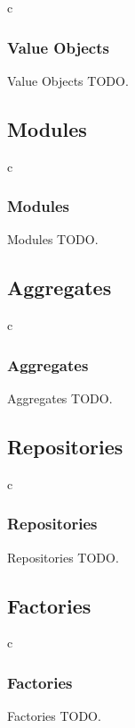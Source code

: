 \documentclass[a4paper,slidestop,xcolor=pst,dvips,blue]{beamer}
\begin{document}
\begin{frame}{c}
    \frametitle{Value Objects}
    \begin{block}{Value Objects}
    TODO.
    \end{block}
\end{frame}

\subsection{Modules}

\begin{frame}{c}
    \frametitle{Modules}
    \begin{block}{Modules}
    TODO.
    \end{block}
\end{frame}

\subsection{Aggregates}

\begin{frame}{c}
    \frametitle{Aggregates}
    \begin{block}{Aggregates}
    TODO.
    \end{block}
\end{frame}

\subsection{Repositories}

\begin{frame}{c}
    \frametitle{Repositories}
    \begin{block}{Repositories}
    TODO.
    \end{block}
\end{frame}

\subsection{Factories}

\begin{frame}{c}
    \frametitle{Factories}
    \begin{block}{Factories}
    TODO.
    \end{block}
\end{frame}


%

%
%	
%    
\end{document}
